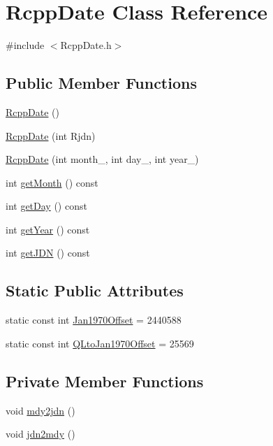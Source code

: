 \hypertarget{classRcppDate}{
\section{RcppDate Class Reference}
\label{classRcppDate}
}


{\ttfamily \#include $<$RcppDate.h$>$}\subsection*{Public Member Functions}
\begin{DoxyCompactItemize}
\item 
\hyperlink{classRcppDate_a4f0f6ae9e9e284fd058d615bcd78d6f9}{RcppDate} ()
\item 
\hyperlink{classRcppDate_a21adf306ddf84cf792f888d220bb9a3f}{RcppDate} (int Rjdn)
\item 
\hyperlink{classRcppDate_a8b96145664d63ec84267870787025fa4}{RcppDate} (int month\_\-, int day\_\-, int year\_\-)
\item 
int \hyperlink{classRcppDate_a16ca2d57a2c4047b027c8b8b0db5184f}{getMonth} () const 
\item 
int \hyperlink{classRcppDate_a20efbcdddceac536425407b3169fff5a}{getDay} () const 
\item 
int \hyperlink{classRcppDate_a79a7696fbce7b448ab545ce35c40811b}{getYear} () const 
\item 
int \hyperlink{classRcppDate_a71332de00640903fe99ce13a37fd9f67}{getJDN} () const 
\end{DoxyCompactItemize}
\subsection*{Static Public Attributes}
\begin{DoxyCompactItemize}
\item 
static const int \hyperlink{classRcppDate_a44b0643ab19489a0fb9700d25f504902}{Jan1970Offset} = 2440588
\item 
static const int \hyperlink{classRcppDate_a06b285d4a04c5225a067e76d4fbfd2d4}{QLtoJan1970Offset} = 25569
\end{DoxyCompactItemize}
\subsection*{Private Member Functions}
\begin{DoxyCompactItemize}
\item 
void \hyperlink{classRcppDate_aaaa626a51e3b2eb4978caf5dcdf9df70}{mdy2jdn} ()
\item 
void \hyperlink{classRcppDate_aca9e6ccbf5bf76e9bba92f2a3083c135}{jdn2mdy} ()
\end{DoxyCompactItemize}
